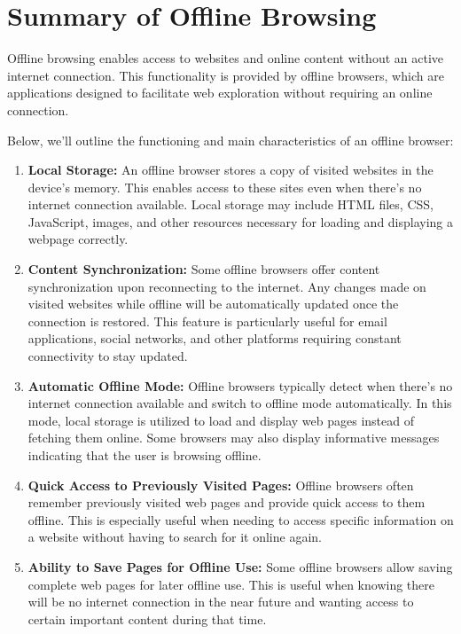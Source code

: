 \documentclass{article}
\begin{document}
\section*{Summary of Offline Browsing}

Offline browsing enables access to websites and online content without an active internet connection. This functionality is provided by offline browsers, which are applications designed to facilitate web exploration without requiring an online connection.

Below, we'll outline the functioning and main characteristics of an offline browser:

\begin{enumerate}
    \item \textbf{Local Storage:} An offline browser stores a copy of visited websites in the device's memory. This enables access to these sites even when there's no internet connection available. Local storage may include HTML files, CSS, JavaScript, images, and other resources necessary for loading and displaying a webpage correctly.
    
    \item \textbf{Content Synchronization:} Some offline browsers offer content synchronization upon reconnecting to the internet. Any changes made on visited websites while offline will be automatically updated once the connection is restored. This feature is particularly useful for email applications, social networks, and other platforms requiring constant connectivity to stay updated.
    
    \item \textbf{Automatic Offline Mode:} Offline browsers typically detect when there's no internet connection available and switch to offline mode automatically. In this mode, local storage is utilized to load and display web pages instead of fetching them online. Some browsers may also display informative messages indicating that the user is browsing offline.
    
    \item \textbf{Quick Access to Previously Visited Pages:} Offline browsers often remember previously visited web pages and provide quick access to them offline. This is especially useful when needing to access specific information on a website without having to search for it online again.
    
    \item \textbf{Ability to Save Pages for Offline Use:} Some offline browsers allow saving complete web pages for later offline use. This is useful when knowing there will be no internet connection in the near future and wanting access to certain important content during that time.
\end{enumerate}
\end{document}
